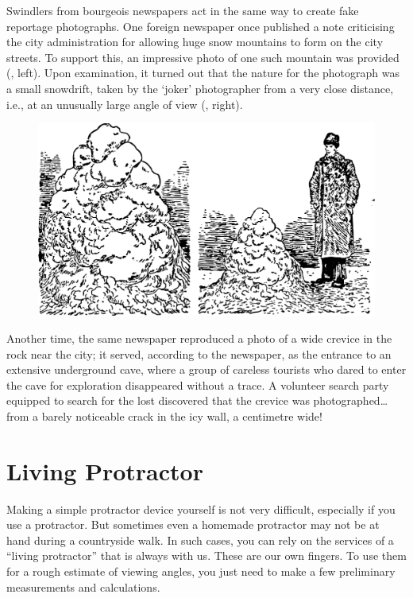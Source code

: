Swindlers from bourgeois newspapers act in the same way to create fake reportage photographs. One foreign newspaper once published a note criticising the city administration for allowing huge snow mountains to form on the city streets. To support this, an impressive photo of one such mountain was provided (, left). Upon examination, it turned out that the nature for the photograph was a small snowdrift, taken by the `joker' photographer from a very close distance, i.e., at an unusually large angle of view (, right). 

\begin{figure}[h!]
\centering
\includegraphics[width=\textwidth]{figures/ch-03/fig-067.pdf}
\end{figure}

Another time, the same newspaper reproduced a photo of a wide crevice in the rock near the city; it served, according to the newspaper, as the entrance to an extensive underground cave, where a group of careless tourists who dared to enter the cave for exploration disappeared without a trace. A volunteer search party equipped to search for the lost discovered that the crevice was photographed\dots{} from a barely noticeable crack in the icy wall, a centimetre wide!



\section{Living Protractor}
\label{sec-3.7}

Making a simple protractor device yourself is not very difficult, especially if you use a protractor. But sometimes even a homemade protractor may not be at hand during a countryside walk. In such cases, you can rely on the services of a ``living protractor'' that is always with us. These are our own fingers. To use them for a rough estimate of viewing angles, you just need to make a few preliminary measurements and calculations.

